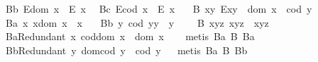 \begin{isabellebody}
\ B{}b{\isacharcolon}\ {\isachardoublequoteopen}E{\isacharparenleft}dom\ x{\isacharparenright}\ \isactrlbold {\isasymrightarrow}\ E\ x{\isachardoublequoteclose}\ \isanewline
\ B{}c{\isacharcolon}\ {\isachardoublequoteopen}E{\isacharparenleft}cod\ x{\isacharparenright}\ \isactrlbold {\isasymrightarrow}\ E\ x{\isachardoublequoteclose}\ \isanewline
\ \ B{}{\isacharcolon}\ {\isachardoublequoteopen}\isactrlbold {\isasymforall}x{\isachardot}\isactrlbold {\isasymforall}y{\isachardot}\ E{\isacharparenleft}x{\isasymcdot}y{\isacharparenright}\ \isactrlbold {\isasymleftrightarrow}\ dom\ x\ {\isasymcong}\ cod\ y{\isachardoublequoteclose}\ \isanewline
\ B{}a{\isacharcolon}\ {\isachardoublequoteopen}\isactrlbold {\isasymforall}x{\isachardot}\ x{\isasymcdot}{\isacharparenleft}dom\ x{\isacharparenright}\ {\isasymcong}\ x{\isachardoublequoteclose}\ \ \isanewline
\ B{}b{\isacharcolon}\ {\isachardoublequoteopen}\isactrlbold {\isasymforall}y{\isachardot}\ {\isacharparenleft}cod\ y{\isacharparenright}{\isasymcdot}y\ {\isasymcong}\ y{\isachardoublequoteclose}\ \ \isanewline
\ \ B{}{\isacharcolon}\ {\isachardoublequoteopen}\isactrlbold {\isasymforall}x{\isachardot}\isactrlbold {\isasymforall}y{\isachardot}\isactrlbold {\isasymforall}z{\isachardot}\ x{\isasymcdot}{\isacharparenleft}y{\isasymcdot}z{\isacharparenright}\ {\isasymcong}\ {\isacharparenleft}x{\isasymcdot}y{\isacharparenright}{\isasymcdot}z{\isachardoublequoteclose}\ \ \isanewline
\isanewline
\ \ \isamarkupfalse%
\ B{}aRedundant{\isacharcolon}\ {\isachardoublequoteopen}\isactrlbold {\isasymforall}x{\isachardot}\ cod{\isacharparenleft}dom\ x{\isacharparenright}\ {\isasymcong}\ dom\ x\ {\isachardoublequoteclose}%
\isadelimproof
\ %
\endisadelimproof
%
\isatagproof
{}\isamarkupfalse%
\ {\isacharparenleft}metis\ B{}a\ B{}\ B{}a{\isacharparenright}%
\endisatagproof
{\isafoldproof}%
%
\isadelimproof
%
\endisadelimproof
\ \isanewline
\ \ \isamarkupfalse%
\ B{}bRedundant{\isacharcolon}\ {\isachardoublequoteopen}\isactrlbold {\isasymforall}y{\isachardot}\ dom{\isacharparenleft}cod\ y{\isacharparenright}\ {\isasymcong}\ cod\ y{\isachardoublequoteclose}%
\isadelimproof
\ %
\endisadelimproof
%
\isatagproof
{}\isamarkupfalse%
\ {\isacharparenleft}metis\ B{}a\ B{}\ B{}b{\isacharparenright}%
\endisatagproof
{\isafoldproof}%
%
\isadelimproof

\end{isabellebody}
